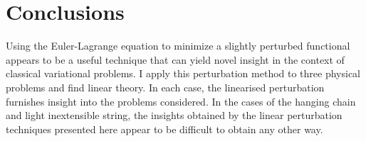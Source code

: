 \documentclass[pdflatex,sn-mathphys-num]{sn-jnl}%
\theoremstyle{thmstyleone}%
\theoremstyle{thmstyletwo}%
\theoremstyle{thmstylethree}%
\begin{document}
\section{Conclusions}

Using the Euler-Lagrange equation to minimize a slightly perturbed
functional appears to be a useful technique that can yield novel
insight in the context of classical variational problems.  I apply
this perturbation method to three physical problems and find linear
theory.  In each case, the linearised perturbation furnishes insight
into the problems considered.  In the cases of the hanging chain and
light inextensible string, the insights obtained by the linear
perturbation techniques presented here appear to be difficult to
obtain any other way.

\end{document}
